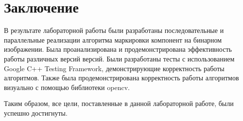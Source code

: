 \documentclass{report}
\begin{document}



\newpage
\section*{Заключение}
	\par В результате лабораторной работы были разработаны последовательные и параллельные реализации алгоритма маркировки компонент на бинарном изображении. Была проанализирована и продемонстрирована эффективность работы различных версий версий. Были разработаны тесты с использованием Google C++ Testing Framework, демонстрирующие корректность работы алгоритмов. Также была продемонстрирована корректность работы алгоритмов визуально с помощью библиотеки opencv.
\par Таким образом, все цели, поставленные в данной лабораторной работе, были успешно достигнуты.
\end{document}
